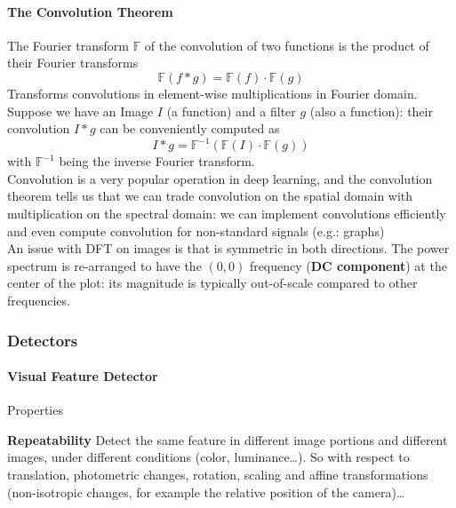 \documentclass[10pt]{report}
\begin{document}
\paragraph{The Convolution Theorem} The Fourier transform $\mathbb{F}$ of the convolution of two functions is the product of their Fourier transforms
$$\mathbb{F}(f*g)=\mathbb{F}(f)\cdot\mathbb{F}(g)$$
Transforms convolutions in element-wise multiplications in Fourier domain. Suppose we have an Image $I$ (a function) and a filter $g$ (also a function): their convolution $I*g$ can be conveniently computed as
$$I*g = \mathbb{F}^{-1}(\mathbb{F}(I)\cdot\mathbb{F}(g))$$
with $\mathbb{F}^{-1}$ being the inverse Fourier transform.\\
Convolution is a very popular operation in deep learning, and the convolution theorem tells us that we can trade convolution on the spatial domain with multiplication on the spectral domain: we can implement convolutions efficiently and even compute convolution for non-standard signals (e.g.: graphs)\\
An issue with DFT on images is that is symmetric in both directions. The power spectrum is re-arranged to have the $(0,0)$ frequency (\textbf{DC component}) at the center of the plot: its magnitude is typically out-of-scale compared to other frequencies.
\subsubsection{Detectors}
\paragraph{Visual Feature Detector} Properties
\begin{list}{}{}
	\item \textbf{Repeatability} Detect the same feature in different image portions and different images, under different conditions (color, luminance\ldots). So with respect to translation, photometric changes, rotation, scaling and affine transformations (non-isotropic changes, for example the relative position of the camera)\ldots
\end{list}
\end{document}
